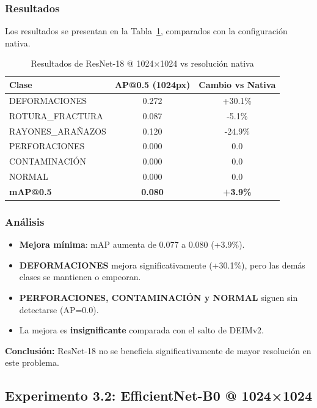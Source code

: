 \subsubsection{Resultados}

Los resultados se presentan en la Tabla~\ref{tab:resnet18_1024}, comparados con la configuración nativa.

\begin{table}[htbp]
\centering
\begin{tabular}{lcc}
\toprule
\textbf{Clase} & \textbf{AP@0.5 (1024px)} & \textbf{Cambio vs Nativa} \\
\midrule
DEFORMACIONES & 0.272 & +30.1\% \\
\mbox{ROTURA\_FRACTURA} & 0.087 & -5.1\% \\
\mbox{RAYONES\_ARAÑAZOS} & 0.120 & -24.9\% \\
PERFORACIONES & 0.000 & 0.0 \\
CONTAMINACIÓN & 0.000 & 0.0 \\
NORMAL & 0.000 & 0.0 \\
\midrule
\textbf{mAP@0.5} & \textbf{0.080} & \textbf{+3.9\%} \\
\bottomrule
\end{tabular}
\caption{Resultados de ResNet-18 @ 1024×1024 vs resolución nativa}
\label{tab:resnet18_1024}
\end{table}

\subsubsection{Análisis}

\begin{itemize}
    \item \textbf{Mejora mínima}: mAP aumenta de 0.077 a 0.080 (+3.9\%).
    \item \textbf{DEFORMACIONES} mejora significativamente (+30.1\%), pero las demás clases se mantienen o empeoran.
    \item \textbf{PERFORACIONES, CONTAMINACIÓN y NORMAL} siguen sin detectarse (AP=0.0).
    \item La mejora es \textbf{insignificante} comparada con el salto de DEIMv2.
\end{itemize}

\textbf{Conclusión:} ResNet-18 no se beneficia significativamente de mayor resolución en este problema.

\subsection{Experimento 3.2: EfficientNet-B0 @ 1024×1024}

